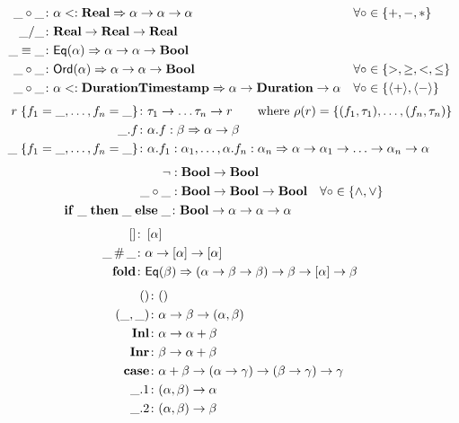 \begin{align*}
  \_\circ\_ &\colon \alpha <: \mathbf{Real} \Rightarrow \alpha
  \to \alpha \to \alpha &&\forall
  \circ \in \left\{+,-,*\right\}\\
  \_ / \_&\colon \mathbf{Real} \to \mathbf{Real} \to
  \mathbf{Real} \\
  \_ \equiv \_ &\colon \mathsf{Eq}(\alpha) \Rightarrow \alpha \to
  \alpha \to \mathbf{Bool}\\
  \_\circ\_ &\colon \mathsf{Ord}(\alpha) \Rightarrow \alpha \to
  \alpha \to \mathbf{Bool} &&\forall
  \circ \in \left\{>,\ge,<,\le\right\}\\
  \_\circ\_ &\colon \alpha <: \mathbf{DurationTimestamp} \Rightarrow \alpha
  \to \mathbf{Duration} \to \alpha &&\forall
  \circ \in \left\{\mathop{\langle+\rangle},\mathop{\langle-\rangle}\right\}
\end{align*}
%
\begin{align*}
  r\;\{f_1 = \_, \ldots , f_n
    = \_\} &\colon \tau_1 \to \ldots \tau_n \to r \qquad
  \text{where } \rho(r) = \left\{(f_1,\tau_1),\ldots,(f_n,\tau_n)\right\}\\
  \_ . f &\colon \alpha.f:\beta \Rightarrow
  \alpha \to \beta\\
  \_\;\{f_1 = \_, \ldots , f_n
    = \_\} &\colon
  \alpha.f_1:\alpha_1,\ldots,\alpha.f_n:\alpha_n
  \Rightarrow \alpha \to \alpha_1 \to \ldots \to \alpha_n \to \alpha
\end{align*}
%
\begin{align*}
  \lnot &: \mathbf{Bool} \to \mathbf{Bool}\\
  \_ \circ \_ &: \mathbf{Bool} \to \mathbf{Bool} \to \mathbf{Bool} &&\forall
  \circ \in \left\{ \land, \lor \right\}\\
  \mathbf{if}\;\_\;\mathbf{then}\;\_\;\mathbf{else}\;\_ &\colon \mathbf{Bool} \to \alpha \to \alpha \to \alpha
\end{align*}
%
\begin{align*}
  \left[\right]&\colon \left[\alpha\right]\\
  \_ \mathop{\#}\_ &\colon \alpha \to \left[\alpha\right] \to
  \left[\alpha\right]\\
  \mathbf{fold} &\colon \mathsf{Eq}(\beta) \Rightarrow (\alpha \to \beta \to \beta) \to \beta
  \to \left[\alpha\right] \to \beta
\end{align*}
%
\begin{align*}
  () &\colon ()\\
  (\_,\_)&\colon \alpha \to \beta \to
  (\alpha,\beta)\\
  \mathbf{Inl}&\colon \alpha \to \alpha + \beta\\
  \mathbf{Inr}&\colon \beta \to \alpha + \beta\\
  \mathbf{case}&\colon \alpha + \beta \to (\alpha \to
    \gamma) \to (\beta \to \gamma) \to \gamma\\
  \_.1&\colon (\alpha,\beta)\to\alpha\\
  \_.2&\colon (\alpha,\beta)\to\beta
\end{align*}

